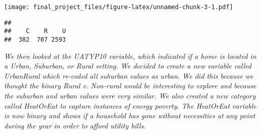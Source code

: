 \documentclass[
]{article}
\newenvironment{Shaded}{\begin{snugshade}}{\end{snugshade}}
\newcommand{\FunctionTok}[1]{\textcolor[rgb]{0.00,0.00,0.00}{#1}}
\newcommand{\NormalTok}[1]{#1}
\newcommand{\OtherTok}[1]{\textcolor[rgb]{0.56,0.35,0.01}{#1}}
\newcommand{\SpecialCharTok}[1]{\textcolor[rgb]{0.00,0.00,0.00}{#1}}
\newcommand{\StringTok}[1]{\textcolor[rgb]{0.31,0.60,0.02}{#1}}
\begin{document}
\texttt{[image: final\_project\_files/figure-latex/unnamed-chunk-3-1.pdf]}

\begin{Shaded}
\end{Shaded}

\begin{verbatim}
## 
##    C    R    U 
##  382  707 2593
\end{verbatim}

\begin{Shaded}
\end{Shaded}

\emph{We then looked at the UATYP10 variable, which indicated if a home
is located in a Urban, Suburban, or Rural setting. We decided to create
a new variable called UrbanRural which re-coded all suburban values as
urban. We did this because we thought the binary Rural v. Non-rural
would be interesting to explore and because the suburban and urban
values were very similar. We also created a new category called
HeatOrEat to capture instances of energy poverty. The HeatOrEat variable
is now binary and shows if a household has gone without necessities at
any point during the year in order to afford utility bills.}
\end{document}
